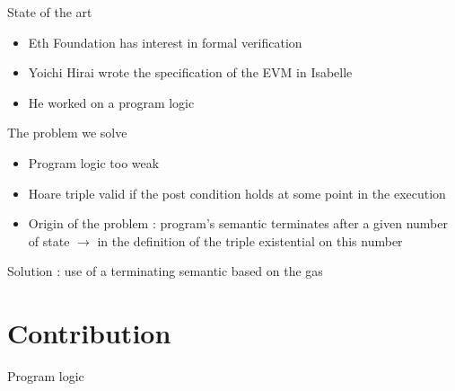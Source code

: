 \documentclass{beamer}
\begin{document}
\begin{frame}{State of the art}
	\begin{itemize}
		\item Eth Foundation has interest in formal verification
		\item Yoichi Hirai wrote the specification of the EVM in Isabelle
		\item He worked on a program logic
	\end{itemize}
\end{frame}

\begin{frame}{The problem we solve}
	\begin{itemize}
		\item Program logic too weak
		\item Hoare triple valid if the post condition holds \alert{at some point} in the execution
		\item Origin of the problem : program's semantic terminates after a given number of state
		$\rightarrow$ in the definition of the triple existential on this number
	\end{itemize}
	Solution : use of a terminating semantic based on the gas
\end{frame}

\section{Contribution}

\begin{frame}{Program logic}
	
\end{frame}
\end{document}
